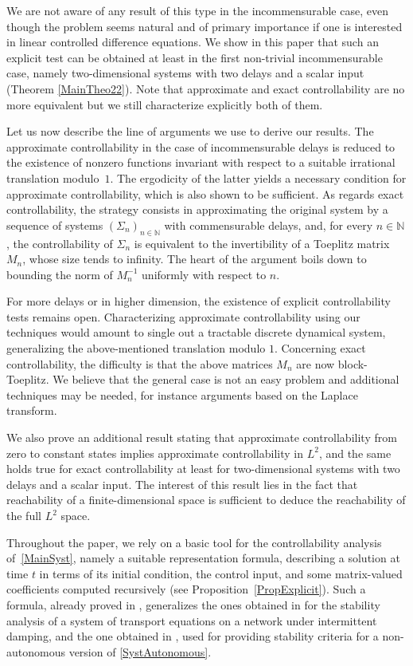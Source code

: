 \documentclass[10pt]{amsart}
\theoremstyle{plain}
\theoremstyle{definition}
\begin{document}
We are not aware of any result of this type in the incommensurable case, even though the problem seems natural and of primary importance if one is interested in linear controlled difference equations. We show in this paper that such an explicit test can be obtained at least in the first non-trivial incommensurable case, namely two-dimensional systems with two delays and a scalar input (Theorem \ref{MainTheo22}). Note that approximate and exact controllability are no more equivalent but we still characterize explicitly both of them.

Let us now describe the line of arguments we use to derive our results. The approx\-imate controllability in the case of incommensurable delays is reduced to the existence of nonzero functions invariant with respect to a suitable irrational translation modulo~$1$. The ergodicity of the latter yields a necessary condition for approximate controllability, which is also shown to be sufficient. As regards exact controllability, the strategy consists in approximating the original system by a sequence of systems $(\Sigma_n)_{n \in \mathbb N}$ with commensurable delays, and, for every $n \in \mathbb N$, the controllability of $\Sigma_n$ is equivalent to the invertibility of a Toeplitz matrix $M_n$, whose size tends to infinity. The heart of the argument boils down to bounding the norm of $M_n^{-1}$ uniformly with respect to $n$.

For more delays or in higher dimension, the existence of explicit controllability tests remains open. Characterizing approximate controllability using our techniques would amount to single out a tractable discrete dynamical system, generalizing the above-mentioned translation modulo $1$. Concerning exact controllability, the difficulty is that the above matrices $M_n$ are now block-Toeplitz. We believe that the general case is not an easy problem and additional techniques may be needed, for instance arguments based on the Laplace transform.

We also prove an additional result stating that approximate controllability from zero to constant states implies approximate controllability in $L^2$, and the same holds true for exact controllability at least for two-dimensional systems with two delays and a scalar input. The interest of this result lies in the fact that reachability of a finite-dimensional space is sufficient to deduce the reachability of the full $L^2$ space.

Throughout the paper, we rely on a basic tool for the controllability analysis of~\eqref{MainSyst}, namely a suitable representation formula, describing a solution at time $t$ in terms of its initial condition, the control input, and some matrix-valued coefficients computed recursively (see Proposition~\ref{PropExplicit}). Such a formula, already proved in \cite{Mazanti2017Relative}, generalizes the ones obtained in \cite[Th.\,3.3 \& 3.6]{Chitour2017Persistently} for the stability analysis of a system of transport equations on a network under intermittent damping, and the one obtained in \cite[Prop.\,3.14]{Chitour2016Stability}, used for providing stability criteria for a non-autonomous version of \eqref{SystAutonomous}.
\end{document}
